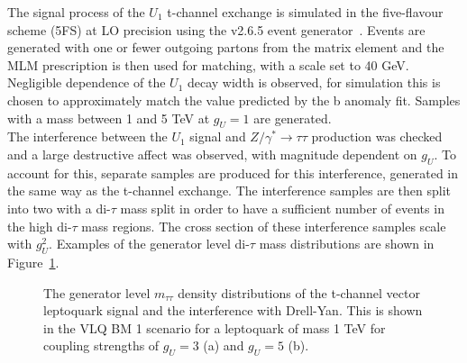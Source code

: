 The signal process of the $U_1$ t-channel exchange is simulated in the five-flavour scheme (5FS) at LO precision using the \MGvATNLO v2.6.5 event generator~\cite{Alwall:2011uj}.
Events are generated with one or fewer outgoing partons from the matrix element and the MLM prescription \cite{Frederix:2012ps} is then used for matching, with a scale set to 40 GeV.
Negligible dependence of the $U_1$ decay width is observed, for simulation this is chosen to approximately match the value predicted by the b anomaly fit.
Samples with a mass between 1 and 5 TeV at $g_U = 1$ are generated. \\

The interference between the $U_1$ signal and $Z/\gamma^* \rightarrow \tau\tau$ production was checked and a large destructive affect was observed, with magnitude dependent on $g_{U}$.
To account for this, separate samples are produced for this interference, generated in the same way as the t-channel exchange.
The interference samples are then split into two with a di-$\tau$ mass split in order to have a sufficient number of events in the high di-$\tau$ mass regions.
The cross section of these interference samples scale with $g_{U}^2$. 
Examples of the generator level di-$\tau$ mass distributions are shown in Figure~\ref{fig:vlq_signal}. \\

\begin{figure}[!hbtp]
\centering
\caption{The generator level $m_{\tau\tau}$ density distributions of the t-channel vector leptoquark signal and the interference with Drell-Yan. This is shown in the VLQ BM 1 scenario for a leptoquark of mass 1 TeV for coupling strengths of $g_{U}=3$ (a) and $g_{U}=5$ (b).}
\label{fig:vlq_signal}
\end{figure}


